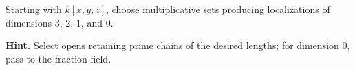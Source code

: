 \begin{problem}\label{chal:vi29-03}
Starting with $k[x,y,z]$, choose multiplicative sets producing localizations of dimensions $3$, $2$, $1$, and $0$.

\textbf{Hint.} Select opens retaining prime chains of the desired lengths; for dimension $0$, pass to the fraction field.
\end{problem}
